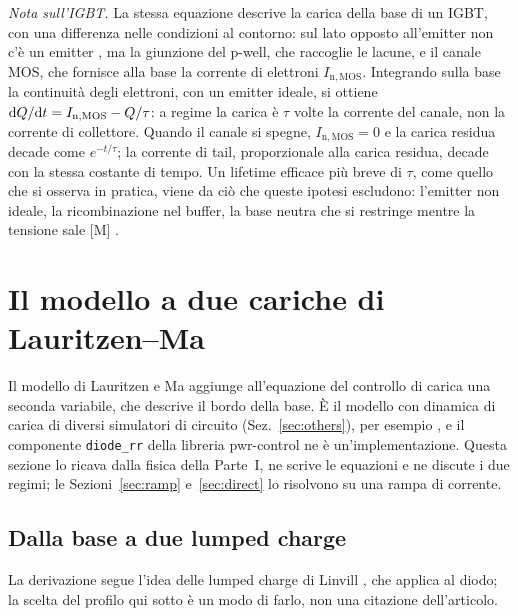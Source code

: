 \documentclass[10pt,a4paper]{scrartcl}
\let\newcommand\pdvaluedefine
\newcommand{\diff}{\mathrm{d}}
\newcommand{\Pp}{p\textsuperscript{+}}
\newcommand{\Np}{n\textsuperscript{+}}
\begin{document}
\emph{Nota sull'IGBT.} La stessa equazione descrive la carica della base di un IGBT, con una differenza nelle condizioni al contorno: sul lato opposto all'emitter \Pp{} non c'è un emitter \Np, ma la giunzione del p-well, che raccoglie le lacune, e il canale MOS, che fornisce alla base la corrente di elettroni $I_\mathrm{n,MOS}$. Integrando sulla base la continuità degli elettroni, con un emitter \Pp{} ideale, si ottiene $\diff Q/\diff t = I_\mathrm{n,MOS} - Q/\tau$: a regime la carica è $\tau$ volte la corrente del canale, non la corrente di collettore. Quando il canale si spegne, $I_\mathrm{n,MOS} = 0$ e la carica residua decade come $e^{-t/\tau}$; la corrente di tail, proporzionale alla carica residua, decade con la stessa costante di tempo. Un lifetime efficace più breve di $\tau$, come quello che si osserva in pratica, viene da ciò che queste ipotesi escludono: l'emitter non ideale, la ricombinazione nel buffer, la base neutra che si restringe mentre la tensione sale [M] \cite{baliga}.
\section{Il modello a due cariche di Lauritzen--Ma}
\label{sec:model}
Il modello di Lauritzen e Ma \cite{lauritzen1991} aggiunge all'equazione del controllo di carica una seconda variabile, che descrive il bordo della base. È il modello con dinamica di carica di diversi simulatori di circuito (Sez.~\ref{sec:others}), per esempio \cite{mathworks}, e il componente \texttt{diode\_rr} della libreria pwr-control ne è un'implementazione. Questa sezione lo ricava dalla fisica della Parte~I, ne scrive le equazioni e ne discute i due regimi; le Sezioni~\ref{sec:ramp} e~\ref{sec:direct} lo risolvono su una rampa di corrente.

\subsection{Dalla base a due lumped charge}
\label{sec:lumped}
La derivazione segue l'idea delle lumped charge di Linvill \cite{linvill1958}, che \cite{lauritzen1991} applica al diodo; la scelta del profilo qui sotto è un modo di farlo, non una citazione dell'articolo.
\end{document}
